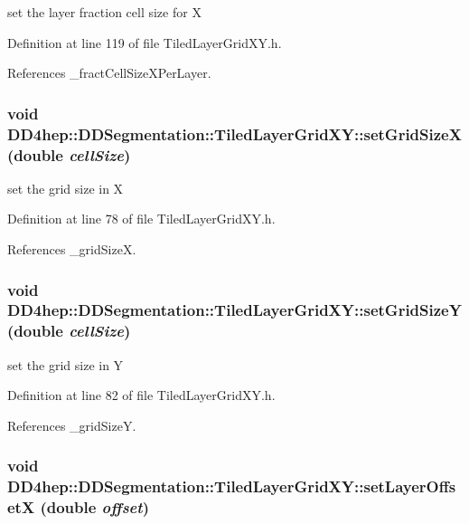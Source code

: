 set the layer fraction cell size for X 

Definition at line 119 of file TiledLayerGridXY.h.

References \_\-fractCellSizeXPerLayer.\hypertarget{class_d_d4hep_1_1_d_d_segmentation_1_1_tiled_layer_grid_x_y_a183f76f3765e6ab4985b0d6eb024785a}{
\subsubsection[{setGridSizeX}]{\setlength{\rightskip}{0pt plus 5cm}void DD4hep::DDSegmentation::TiledLayerGridXY::setGridSizeX (double {\em cellSize})}}
\label{class_d_d4hep_1_1_d_d_segmentation_1_1_tiled_layer_grid_x_y_a183f76f3765e6ab4985b0d6eb024785a}


set the grid size in X 

Definition at line 78 of file TiledLayerGridXY.h.

References \_\-gridSizeX.\hypertarget{class_d_d4hep_1_1_d_d_segmentation_1_1_tiled_layer_grid_x_y_a2556a5e0000580a8ffdf93bde33c36b8}{
\subsubsection[{setGridSizeY}]{\setlength{\rightskip}{0pt plus 5cm}void DD4hep::DDSegmentation::TiledLayerGridXY::setGridSizeY (double {\em cellSize})}}
\label{class_d_d4hep_1_1_d_d_segmentation_1_1_tiled_layer_grid_x_y_a2556a5e0000580a8ffdf93bde33c36b8}


set the grid size in Y 

Definition at line 82 of file TiledLayerGridXY.h.

References \_\-gridSizeY.\hypertarget{class_d_d4hep_1_1_d_d_segmentation_1_1_tiled_layer_grid_x_y_a4368c4380115aa312e1b127e4b15aed9}{
\subsubsection[{setLayerOffsetX}]{\setlength{\rightskip}{0pt plus 5cm}void DD4hep::DDSegmentation::TiledLayerGridXY::setLayerOffsetX (double {\em offset})}}
\label{class_d_d4hep_1_1_d_d_segmentation_1_1_tiled_layer_grid_x_y_a4368c4380115aa312e1b127e4b15aed9}


